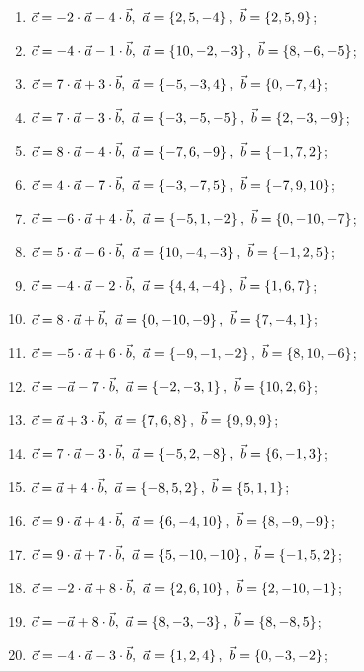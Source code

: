 	\begin{enumerate}
		\setcounter{enumi}{\value{tasks}}

			\item \( \displaystyle \vec{c} = - 2 \cdot \vec{a} - 4 \cdot \vec{b}, ~ \vec{a} = \left\lbrace 2, 5, -4 \right\rbrace, ~ \vec{b} = \left\lbrace 2, 5, 9 \right\rbrace \);
			\item \( \displaystyle \vec{c} = - 4 \cdot \vec{a} - 1 \cdot \vec{b}, ~ \vec{a} = \left\lbrace 10, -2, -3 \right\rbrace, ~ \vec{b} = \left\lbrace 8, -6, -5 \right\rbrace \);
			\item \( \displaystyle \vec{c} = 7 \cdot \vec{a} + 3 \cdot \vec{b}, ~ \vec{a} = \left\lbrace -5, -3, 4 \right\rbrace, ~ \vec{b} = \left\lbrace 0, -7, 4 \right\rbrace \);
			\item \( \displaystyle \vec{c} = 7 \cdot \vec{a} - 3 \cdot \vec{b}, ~ \vec{a} = \left\lbrace -3, -5, -5 \right\rbrace, ~ \vec{b} = \left\lbrace 2, -3, -9 \right\rbrace \);
			\item \( \displaystyle \vec{c} = 8 \cdot \vec{a} - 4 \cdot \vec{b}, ~ \vec{a} = \left\lbrace -7, 6, -9 \right\rbrace, ~ \vec{b} = \left\lbrace -1, 7, 2 \right\rbrace \);
			\item \( \displaystyle \vec{c} = 4 \cdot \vec{a} - 7 \cdot \vec{b}, ~ \vec{a} = \left\lbrace -3, -7, 5 \right\rbrace, ~ \vec{b} = \left\lbrace -7, 9, 10 \right\rbrace \);
			\item \( \displaystyle \vec{c} = - 6 \cdot \vec{a} + 4 \cdot \vec{b}, ~ \vec{a} = \left\lbrace -5, 1, -2 \right\rbrace, ~ \vec{b} = \left\lbrace 0, -10, -7 \right\rbrace \);
			\item \( \displaystyle \vec{c} = 5 \cdot \vec{a} - 6 \cdot \vec{b}, ~ \vec{a} = \left\lbrace 10, -4, -3 \right\rbrace, ~ \vec{b} = \left\lbrace -1, 2, 5 \right\rbrace \);
			\item \( \displaystyle \vec{c} = - 4 \cdot \vec{a} - 2 \cdot \vec{b}, ~ \vec{a} = \left\lbrace 4, 4, -4 \right\rbrace, ~ \vec{b} = \left\lbrace 1, 6, 7 \right\rbrace \);
			\item \( \displaystyle \vec{c} = 8 \cdot \vec{a} + \vec{b}, ~ \vec{a} = \left\lbrace 0, -10, -9 \right\rbrace, ~ \vec{b} = \left\lbrace 7, -4, 1 \right\rbrace \);
			\item \( \displaystyle \vec{c} = - 5 \cdot \vec{a} + 6 \cdot \vec{b}, ~ \vec{a} = \left\lbrace -9, -1, -2 \right\rbrace, ~ \vec{b} = \left\lbrace 8, 10, -6 \right\rbrace \);
			\item \( \displaystyle \vec{c} = - \vec{a} - 7 \cdot \vec{b}, ~ \vec{a} = \left\lbrace -2, -3, 1 \right\rbrace, ~ \vec{b} = \left\lbrace 10, 2, 6 \right\rbrace \);
			\item \( \displaystyle \vec{c} = \vec{a} + 3 \cdot \vec{b}, ~ \vec{a} = \left\lbrace 7, 6, 8 \right\rbrace, ~ \vec{b} = \left\lbrace 9, 9, 9 \right\rbrace \);
			\item \( \displaystyle \vec{c} = 7 \cdot \vec{a} - 3 \cdot \vec{b}, ~ \vec{a} = \left\lbrace -5, 2, -8 \right\rbrace, ~ \vec{b} = \left\lbrace 6, -1, 3 \right\rbrace \);
			\item \( \displaystyle \vec{c} = \vec{a} + 4 \cdot \vec{b}, ~ \vec{a} = \left\lbrace -8, 5, 2 \right\rbrace, ~ \vec{b} = \left\lbrace 5, 1, 1 \right\rbrace \);
			\item \( \displaystyle \vec{c} = 9 \cdot \vec{a} + 4 \cdot \vec{b}, ~ \vec{a} = \left\lbrace 6, -4, 10 \right\rbrace, ~ \vec{b} = \left\lbrace 8, -9, -9 \right\rbrace \);
			\item \( \displaystyle \vec{c} = 9 \cdot \vec{a} + 7 \cdot \vec{b}, ~ \vec{a} = \left\lbrace 5, -10, -10 \right\rbrace, ~ \vec{b} = \left\lbrace -1, 5, 2 \right\rbrace \);
			\item \( \displaystyle \vec{c} = - 2 \cdot \vec{a} + 8 \cdot \vec{b}, ~ \vec{a} = \left\lbrace 2, 6, 10 \right\rbrace, ~ \vec{b} = \left\lbrace 2, -10, -1 \right\rbrace \);
			\item \( \displaystyle \vec{c} = - \vec{a} + 8 \cdot \vec{b}, ~ \vec{a} = \left\lbrace 8, -3, -3 \right\rbrace, ~ \vec{b} = \left\lbrace 8, -8, 5 \right\rbrace \);
			\item \( \displaystyle \vec{c} = - 4 \cdot \vec{a} - 3 \cdot \vec{b}, ~ \vec{a} = \left\lbrace 1, 2, 4 \right\rbrace, ~ \vec{b} = \left\lbrace 0, -3, -2 \right\rbrace \);

		\setcounter{tasks}{\value{enumi}}
	\end{enumerate}

